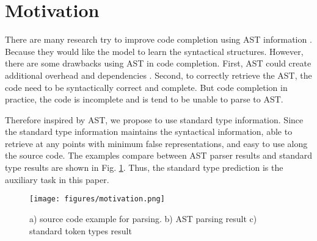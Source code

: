 
\section{Motivation}

There are many research try to improve code completion using AST information \cite{izadi2022codefill} \cite{li2017code} \cite{kim2021code}. Because they would like the model to learn the syntactical structures. However, there are some drawbacks using AST in code completion. First, AST could create additional overhead and dependencies \cite{svyatkovskiy2020intellicode}. Second, to correctly retrieve the AST, the code need to be syntactically correct and complete. But code completion in practice, the code is incomplete and is tend to be unable to parse to AST. 

Therefore inspired by AST, we propose to use standard type information. Since the standard type information maintains the syntactical information, able to retrieve at any points with minimum false representations, and easy to use along the source code. The examples compare between AST parser results and standard type results are shown in Fig. \ref{fig:ASTvsType}. Thus, the standard type prediction is the auxiliary task in this paper.

\begin{figure}
    \centering
    \texttt{[image: figures/motivation.png]}
    \caption{a) source code example for parsing. b) AST parsing result c) standard token types result}
    \label{fig:ASTvsType}
\end{figure}

